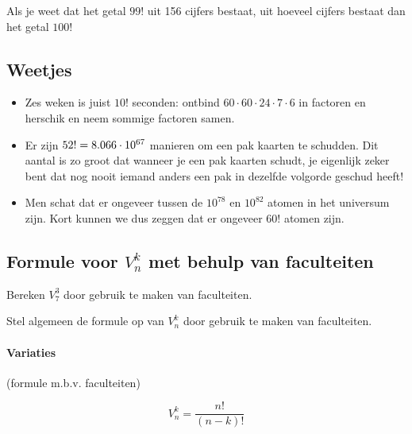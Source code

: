\documentclass[12pt,twoside]{article}
\begin{document}
\begin{oefening}
Als je weet dat het getal $99!$ uit 156 cijfers bestaat, uit hoeveel cijfers bestaat dan het getal $100!$
\end{oefening}

\begin{theorie}

\subsection*{Weetjes}
\begin{itemize}
  \item Zes weken is juist $10!$ seconden: ontbind $60\cdot 60\cdot 24\cdot 7\cdot 6$ in factoren en herschik en neem sommige factoren samen.
  \item Er zijn $52!=8.066\cdot 10^{67}$ manieren om een pak kaarten te schudden. Dit aantal is zo groot dat wanneer je een pak kaarten schudt, je eigenlijk zeker bent dat nog nooit iemand anders een pak in dezelfde volgorde geschud heeft!
  \item Men schat dat er ongeveer tussen de $10^78$ en $10^82$ atomen in het universum zijn. Kort kunnen we dus zeggen dat er ongeveer $60!$ atomen zijn.
\end{itemize}

\pagebreak
\subsection{Formule voor $V^k_n$ met behulp van faculteiten}

Bereken $V^3_7$ door gebruik te maken van faculteiten.

Stel algemeen de formule op van $V^k_n$ door gebruik te maken van faculteiten.

\paragraph*{Variaties} (formule m.b.v. faculteiten)
\begin{mdframed}
$$V^k_n=\dfrac{n!}{(n-k)!}$$
\end{mdframed}

\end{theorie}
\end{document}
